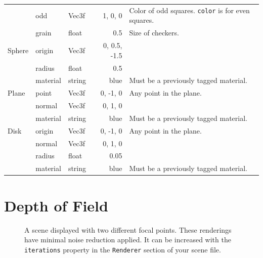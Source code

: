 \documentclass{article}
\begin{document}
\begin{tabular}{p{}llrp{}}
    & odd & Vec3f & 1, 0, 0 & Color of odd squares. \texttt{color} is for even squares.\\
    & grain & float & 0.5 & Size of checkers.\\
    \hline
    Sphere & origin & Vec3f & 0, 0.5, -1.5 &\\
    & radius & float & 0.5 &\\
    & material & string & blue & Must be a previously tagged material.\\
    \hline
    Plane & point & Vec3f & 0, -1, 0 & Any point in the plane.\\
    & normal & Vec3f & 0, 1, 0 &\\
    & material & string & blue & Must be a previously tagged material.\\
    \hline
    Disk & origin & Vec3f & 0, -1, 0 & Any point in the plane.\\
    & normal & Vec3f & 0, 1, 0 &\\
    & radius & float & 0.05 &\\
    & material & string & blue & Must be a previously tagged material.\\
\end{tabular}

\section{Depth of Field}

\begin{figure}[H]
    \centering
    \caption{A scene displayed with two different focal points. These renderings have minimal noise reduction applied. It can be increased with the \texttt{iterations} property in the \texttt{Renderer} section of your scene file.}
\end{figure}
\end{document}
